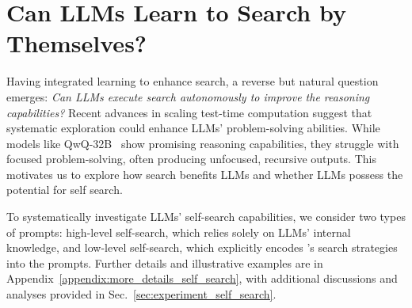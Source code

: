 \section{Can LLMs Learn to Search by Themselves?}
\label{sec:llm_self_search}
Having integrated learning to enhance search, a reverse but natural question emerges: 
\textit{Can LLMs execute search autonomously to improve the reasoning capabilities?}
Recent advances in scaling test-time computation suggest that systematic exploration could enhance LLMs' problem-solving abilities. While models like QwQ-32B~\cite{qwq-32b-preview} show promising reasoning capabilities, they struggle with focused problem-solving, often producing unfocused, recursive outputs. This motivates us to explore how search benefits LLMs and whether LLMs possess the potential for self search.

To systematically investigate LLMs' self-search capabilities, we consider two types of prompts: high-level self-search, which relies solely on LLMs' internal knowledge, and low-level self-search, which explicitly encodes \method's search strategies into the prompts. Further details and illustrative examples are in Appendix~\ref{appendix:more_details_self_search}, with additional discussions and analyses provided in Sec.~\ref{sec:experiment_self_search}.

